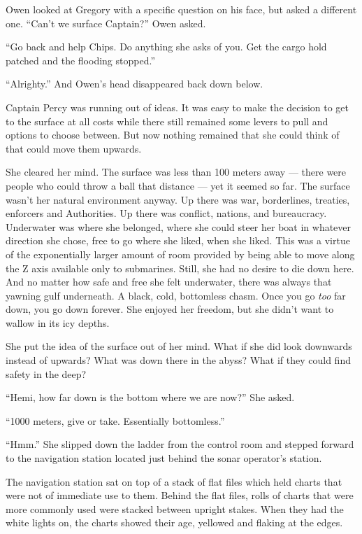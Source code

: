 \documentclass[]{article}
\begin{document}
\begin{multicols}{2}
Owen looked at Gregory with a specific question on his face, but asked a
different one. ``Can't we surface Captain?'' Owen asked.

``Go back and help Chips. Do anything she asks of you. Get the cargo
hold patched and the flooding stopped.''

``Alrighty.'' And Owen's head disappeared back down below.

Captain Percy was running out of ideas. It was easy to make the decision
to get to the surface at all costs while there still remained some
levers to pull and options to choose between. But now nothing remained
that she could think of that could move them upwards.

She cleared her mind. The surface was less than 100 meters away ---
there were people who could throw a ball that distance --- yet it seemed
so far. The surface wasn't her natural environment anyway. Up there was
war, borderlines, treaties, enforcers and Authorities. Up there was
conflict, nations, and bureaucracy. Underwater was where she belonged,
where she could steer her boat in whatever direction she chose, free to
go where she liked, when she liked. This was a virtue of the
exponentially larger amount of room provided by being able to move along
the Z axis available only to submarines. Still, she had no desire to die
down here. And no matter how safe and free she felt underwater, there
was always that yawning gulf underneath. A black, cold, bottomless
chasm. Once you go \emph{too} far down, you go down forever. She enjoyed
her freedom, but she didn't want to wallow in its icy depths.

She put the idea of the surface out of her mind. What if she did look
downwards instead of upwards? What was down there in the abyss? What if
they could find safety in the deep?

``Hemi, how far down is the bottom where we are now?'' She asked.

``1000 meters, give or take. Essentially bottomless.''

``Hmm.'' She slipped down the ladder from the control room and stepped
forward to the navigation station located just behind the sonar
operator's station.

The navigation station sat on top of a stack of flat files which held
charts that were not of immediate use to them. Behind the flat files,
rolls of charts that were more commonly used were stacked between
upright stakes. When they had the white lights on, the charts showed
their age, yellowed and flaking at the edges.


\end{multicols}
\end{document}
